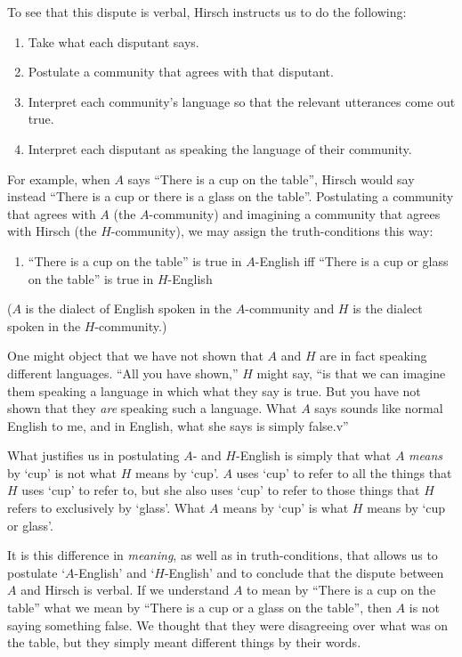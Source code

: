 \documentclass[11pt]{article}
\begin{document}
\begin{spacing}{1.25}
To see that this dispute is verbal, Hirsch instructs us to do the
following:

\begin{enumerate}
  \item Take what each disputant says.
  \item Postulate a community that agrees with that disputant.
  \item Interpret each community's language so that the relevant
    utterances come out true.
  \item Interpret each disputant as speaking the language of their
    community.
\end{enumerate}

For example, when $A$ says ``There is a cup on the table'', Hirsch
would say instead ``There is a cup or there is a glass on the table''.
Postulating a community that agrees with $A$ (the $A$-community) and
imagining a community that agrees with Hirsch (the $H$-community), we
may assign the truth-conditions this way:
\begin{enumerate}[itemindent=25pt, label=(T)]
    \item ``There is a cup on the table'' is true in $A$-English iff
    ``There is a cup or glass on the table'' is true in $H$-English
\end{enumerate}
($A$ is the dialect of English spoken in the $A$-community and $H$ is
the dialect spoken in the $H$-community.)

One might object that we have not shown that $A$ and $H$ are in fact
speaking different languages.  ``All you have shown,'' $H$
might say, ``is that we can imagine them speaking a language in which
what they say is true.  But you have not shown that they {\em are}
speaking such a language.  What $A$ says sounds like normal English to
me, and in English, what she says is simply false.v''

What justifies us in postulating $A$- and $H$-English is simply that
what $A$ {\em means} by `cup' is not what $H$ means by `cup'.  $A$
uses `cup' to refer to all the things that $H$ uses `cup' to refer to,
but she also uses `cup' to refer to those things that $H$ refers to
exclusively by `glass'.  What $A$ means by `cup' is what $H$ means by
`cup or glass'.

It is this difference in {\em meaning}, as well as in
truth-conditions, that allows us to postulate `$A$-English' and
`$H$-English' and to conclude that the dispute between $A$ and Hirsch
is verbal. If we understand $A$ to mean by ``There is a cup on the
table'' what we mean by ``There is a cup or a glass on the table'',
then $A$ is not saying something false.  We thought that they were
disagreeing over what was on the table, but they simply meant
different things by their words.


\end{spacing}
\end{document}
